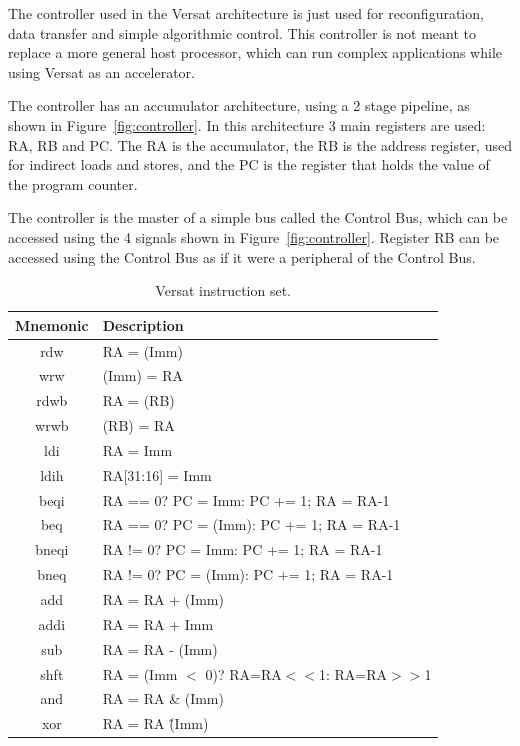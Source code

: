The controller used in the Versat architecture is just used for reconfiguration,
data transfer and simple algorithmic control. This controller is not meant to
replace a more general host processor, which can run complex applications while
using Versat as an accelerator.

The controller has an accumulator architecture, using a 2 stage pipeline, as
shown in Figure~\ref{fig:controller}. In this architecture 3 main registers are
used: RA, RB and PC. The RA is the accumulator, the RB is the address register,
used for indirect loads and stores, and the PC is the register that holds the
value of the program counter.

The controller is the master of a simple bus called the Control Bus, which can
be accessed using the 4 signals shown in Figure~\ref{fig:controller}. Register
RB can be accessed using the Control Bus as if it were a peripheral of the
Control Bus.

\begin{table}[!htbp]
	\centering
	\caption{Versat instruction set.}
	\label{tab:isa}
	\begin{tabular}{|c|l|}
		\hline 
		{\bf Mnemonic} & {\bf Description} \\
		\hline \hline 
		rdw & RA = (Imm)\\
		\hline
		wrw & (Imm) = RA\\
		\hline
		rdwb & RA = (RB)\\
		\hline
		wrwb & (RB) = RA\\
		\hline
		ldi & RA = Imm\\
		\hline
		ldih & RA[31:16] = Imm\\
		\hline
		beqi & RA == 0? PC = Imm: PC += 1; RA = RA-1\\
		\hline
		beq & RA == 0? PC = (Imm): PC += 1; RA = RA-1\\
		\hline
		bneqi & RA != 0? PC = Imm: PC += 1; RA = RA-1\\
		\hline
		bneq & RA != 0? PC = (Imm): PC += 1; RA = RA-1\\
		\hline
		add & RA = RA + (Imm)\\
		\hline
		addi & RA = RA + Imm\\
		\hline
		sub & RA = RA - (Imm)\\
		\hline
		shft & RA = (Imm $<$ 0)? RA=RA$<<$1: RA=RA$>>$1\\
		\hline
		and & RA = RA \& (Imm)\\
		\hline
		xor & RA = RA \^ (Imm)\\
		\hline
	\end{tabular}
\end{table}

